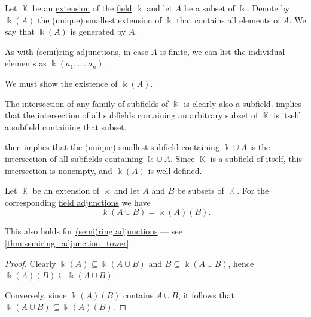 \begin{definition}\label{def:field_adjunction}
  Let \( \BbbK \) be an \hyperref[def:field/subobject]{extension} of the \hyperref[def:field]{field} \( \Bbbk \) and let \( A \) be a subset of \( \Bbbk \). Denote by \( \Bbbk(A) \) the (unique) smallest extension of \( \Bbbk \) that contains all elements of \( A \). We say that \( \Bbbk(A) \) is generated by  \( A \).

  As with \hyperref[def:semiring_adjunction]{(semi)ring adjunctions}, in case \( A \) is finite, we can list the individual elements as \( \Bbbk(a_1, \ldots, a_n) \).
\end{definition}
\begin{defproof}
  We must show the existence of \( \Bbbk(A) \).

  The intersection of any family of subfields of \( \BbbK \) is clearly also a subfield.  implies that the intersection of all subfields containing an arbitrary subset of \( \BbbK \) is itself a subfield containing that subset.

   then implies that the (unique) smallest subfield containing \( \Bbbk \cup A \) is the intersection of all subfields containing \( \Bbbk \cup A \). Since \( \BbbK \) is a subfield of itself, this intersection is nonempty, and \( \Bbbk(A) \) is well-defined.
\end{defproof}

\begin{proposition}\label{thm:field_adjunction_tower}
  Let \( \BbbK \) be an extension of \( \Bbbk \) and let \( A \) and \( B \) be subsets of \( \BbbK \). For the corresponding \hyperref[def:field_adjunction]{field adjunctions} we have
  \begin{equation*}
    \Bbbk(A \cup B) = \Bbbk(A)(B).
  \end{equation*}
\end{proposition}
\begin{comments}
  \item This also holds for \hyperref[def:semiring_adjunction]{(semi)ring adjunctions} --- see \cref{thm:semiring_adjunction_tower}.
\end{comments}
\begin{proof}
  Clearly \( \Bbbk(A) \subseteq \Bbbk(A \cup B) \) and \( B \subseteq \Bbbk(A \cup B) \), hence \( \Bbbk(A)(B) \subseteq \Bbbk(A \cup B) \).

  Conversely, since \( \Bbbk(A)(B) \) contains \( A \cup B \), it follows that \( \Bbbk(A \cup B) \subseteq \Bbbk(A)(B) \).
\end{proof}

